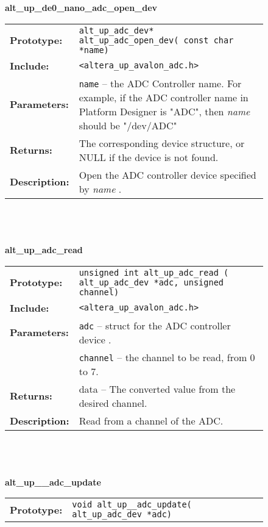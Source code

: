 \begin{figure}[h]

\begin{flushleft} %
\parbox{12.5cm}{
{\small \textsf{\textbf{alt\_up\_de0\_nano\_adc\_open\_dev}}} \\
\begin{tabular}[ht]{lp{11cm}}
	\textbf{Prototype:}
	&
	\texttt{alt\_up\_adc\_dev* alt\_up\_adc\_open\_dev( const char *name)} 
	\\
	\textbf{Include:}
	&
	{\tt <altera\_up\_avalon\_adc.h>}
	\\
	{\textbf{Parameters:}}
	&
	\texttt{{name}}
	 -- the ADC Controller name. For example, if the ADC controller name in Platform Designer is "ADC", then {\it name} should be "/dev/ADC" 
	\\
	\textbf{Returns:}
	& The corresponding device structure, or NULL if the device is not found.
	\\
	\textbf{Description:}
	& Open the ADC controller device specified by {\it name} .\\
\end{tabular}
\\
\\
\\
{\small \textsf{\textbf{alt\_up\_adc\_read}}} \\
\begin{tabular}[ht]{lp{11cm}}
	\textbf{Prototype:}
	&
	\texttt{unsigned int alt\_up\_adc\_read ( alt\_up\_adc\_dev *adc, unsigned channel)} 
	\\
	\textbf{Include:}
	&
	{\tt <altera\_up\_avalon\_adc.h>}
	\\
	{\textbf{Parameters:}}
	&
	\texttt{{adc}}
	 -- struct for the ADC controller device . 
	\\
	&
	\texttt{{channel}}
	 -- the channel to be read, from 0 to 7.
	 \\
	\textbf{Returns:}
	& data -- The converted value from the desired channel.
	\\
	\textbf{Description:}
	& Read from a channel of the ADC.\\
\end{tabular}
\\
\\
\\
{\small \textsf{\textbf{alt\_up\_\_adc\_update}}} \\
\begin{tabular}[ht]{lp{11cm}}
	\textbf{Prototype:}
	&
	\texttt{void alt\_up\_\_adc\_update( alt\_up\_adc\_dev *adc)} 

\end{tabular}}
\end{flushleft}
\end{figure}
